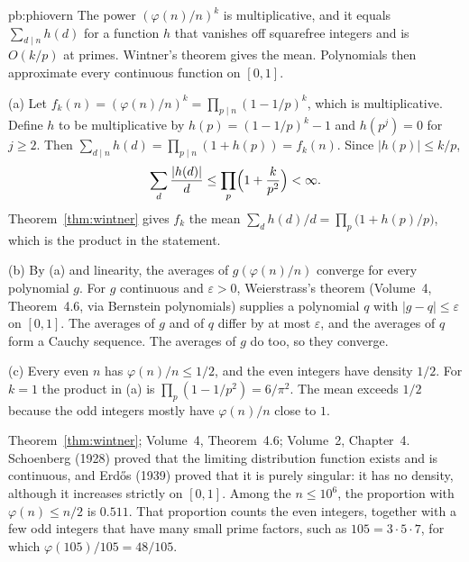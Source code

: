 \begin{solution}{pb:phiovern}
\idea The power $(\varphi(n)/n)^k$ is multiplicative, and it equals $\sum_{d\mid n}h(d)$ for a function $h$ that vanishes off squarefree integers and is $O(k/p)$ at primes. Wintner's theorem gives the mean. Polynomials then approximate every continuous function on $[0,1]$.

\writeup (a) Let $f_k(n)=(\varphi(n)/n)^k=\prod_{p\mid n}(1-1/p)^k$, which is multiplicative. Define $h$ to be multiplicative by $h(p)=(1-1/p)^k-1$ and $h(p^j)=0$ for $j\ge2$. Then $\sum_{d\mid n}h(d)=\prod_{p\mid n}(1+h(p))=f_k(n)$. Since $|h(p)|\le k/p$,
\[
\sum_d\frac{|h(d)|}d\le\prod_p\Bigl(1+\frac k{p^2}\Bigr)<\infty.
\]
Theorem~\ref{thm:wintner} gives $f_k$ the mean $\sum_d h(d)/d=\prod_p\bigl(1+h(p)/p\bigr)$, which is the product in the statement.

(b) By (a) and linearity, the averages of $g(\varphi(n)/n)$ converge for every polynomial $g$. For $g$ continuous and $\varepsilon>0$, Weierstrass's theorem (Volume~4, Theorem~4.6, via Bernstein polynomials) supplies a polynomial $q$ with $|g-q|\le\varepsilon$ on $[0,1]$. The averages of $g$ and of $q$ differ by at most $\varepsilon$, and the averages of $q$ form a Cauchy sequence. The averages of $g$ do too, so they converge.

(c) Every even $n$ has $\varphi(n)/n\le1/2$, and the even integers have density $1/2$. For $k=1$ the product in (a) is $\prod_p(1-1/p^2)=6/\pi^2$. The mean exceeds $1/2$ because the odd integers mostly have $\varphi(n)/n$ close to $1$.

\tools Theorem~\ref{thm:wintner}; Volume~4, Theorem~4.6; Volume~2, Chapter~4.
\leads Schoenberg (1928) proved that the limiting distribution function exists and is continuous, and Erd\H os (1939) proved that it is purely singular: it has no density, although it increases strictly on $[0,1]$. Among the $n\le10^6$, the proportion with $\varphi(n)\le n/2$ is $0.511$. That proportion counts the even integers, together with a few odd integers that have many small prime factors, such as $105=3\cdot5\cdot7$, for which $\varphi(105)/105=48/105$.
\end{solution}

